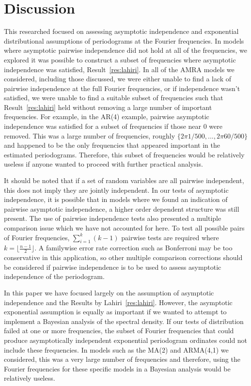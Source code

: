 \documentclass{article}\usepackage{graphicx, color}
\theoremstyle{plain}
\begin{document}
\section{Discussion}

This researched focused on assessing asymptotic independence and exponential distributional assumptions of periodograms at the Fourier frequencies. In models where asymptotic pairwise independence did not hold at all of the frequencies, we explored it was possible to construct a subset of frequencies where asymptotic independence was satisfied, Result~\ref{res:lahiri}. In all of the AMRA models we considered, including those discussed, we were either unable to find a lack of pairwise independence at the full Fourier frequencies, or if independence wasn't satisfied, we were unable to find a suitable subset of frequencies such that Result~\ref{res:lahiri} held without removing a large number of important frequencies. For example, in the AR(4) example, pairwise asymptotic independence was satisfied for a subset of frequencies if those near 0 were removed. This was a large number of frequencies, roughly $\{2\pi 1/500,...,2\pi 60/500\}$ and happened to be the only frequencies that appeared important in the estimated periodograms. Therefore, this subset of frequencies would be relatively useless if anyone wanted to proceed with further practical analysis.

It should be noted that if a set of random variables are all pairwise independent, this does not imply they are jointly independent. In our tests of asymptotic independence, it is possible that in models where we found an indication of pairwise asymptotic independence, a higher order dependent structure was still present. The use of pairwise independence tests also presented a multiple comparison issue which we have not accounted for here. To test all possible pairs of Fourier frequencies, $\sum_{i=1}^k (k-1)$ pairwise tests are required where $k=\lfloor\frac{n-1}{2}\rfloor$. A familywise error rate correction such as Bonferroni may be too conservative in this application, so other multiple comparison corrections should be considered if pairwise independence is to be used to assess asymptotic independence of the periodogram.

In this paper we have focused largely on the assumption of asymptotic independence and the Results by Lahiri~\ref{res:lahiri}. However, the asymptotic exponential assumption is equally as important if we wanted to attempt to implement a Bayesian analysis of the spectral density. If our tests of distribution failed at one or more frequencies, the subset of Fourier frequencies that could produce asymptotically independent exponential periodogram ordinates could not include these frequencies. In models such as the MA(2) and ARMA(4,1) we considered, this was a very large number of frequencies and therefore, using the Fourier frequencies for these specific models in a Bayesian analysis would be relatively useless. 
\end{document}
